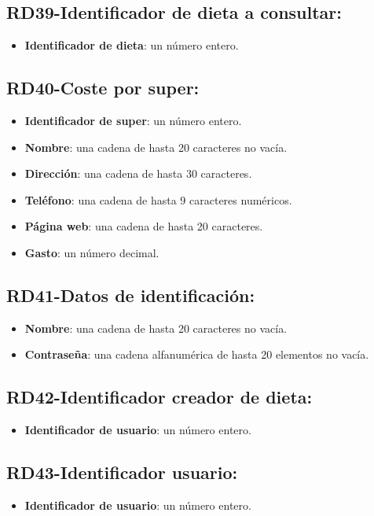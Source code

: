 \documentclass[a4paper,12pt]{report}
\begin{document}
\subsection{RD39-Identificador de dieta a consultar:}
\label{sec-2-1-39}
\begin{itemize}
\item \textbf{Identificador de dieta}: un número entero.
\end{itemize}
\subsection{RD40-Coste por super:}
\label{sec-2-1-40}
\begin{itemize}
\item \textbf{Identificador de super}: un número entero.
\item \textbf{Nombre}:  una cadena de hasta 20 caracteres no vacía.
\item \textbf{Dirección}:  una cadena de hasta 30 caracteres.
\item \textbf{Teléfono}: una cadena de hasta 9 caracteres numéricos.
\item \textbf{Página web}: una cadena de hasta 20 caracteres.
\item \textbf{Gasto}: un número decimal.
\end{itemize}
\subsection{RD41-Datos de identificación:}
\label{sec-2-1-41}
\begin{itemize}
\item \textbf{Nombre}: una cadena de hasta 20 caracteres no vacía.
\item \textbf{Contraseña}: una cadena alfanumérica de hasta 20 elementos no vacía.
\end{itemize}
\subsection{RD42-Identificador creador de dieta:}
\label{sec-2-1-42}
\begin{itemize}
\item \textbf{Identificador de usuario}: un número entero.
\end{itemize}
\subsection{RD43-Identificador usuario:}
\label{sec-2-1-43}
\begin{itemize}
\item \textbf{Identificador de usuario}: un número entero.
\end{itemize}
\end{document}
